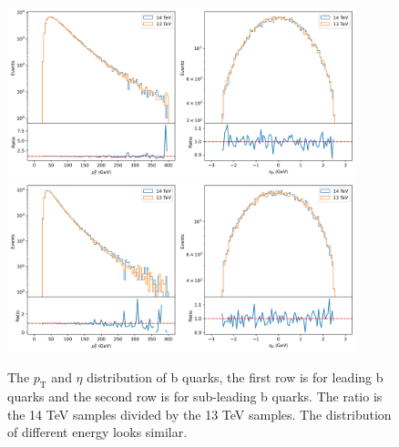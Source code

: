 \documentclass[12pt]{article}
\begin{document}
		\begin{figure}[htpb]
			\centering
			\includegraphics[width=0.9\textwidth]{pp4b-pt-eta-13-14TeV-1.png}
			\includegraphics[width=0.9\textwidth]{pp4b-pt-eta-13-14TeV-2.png}
			\caption{The $p_{\text{T}}$ and $\eta$ distribution of b quarks, the first row is for leading b quarks and the second row is for sub-leading b quarks. The ratio is the 14 TeV samples divided by the 13 TeV samples. The distribution of different energy looks similar.}
			\label{fig:pp4b-pt-eta-13-14TeV}
		\end{figure}
\end{document}

